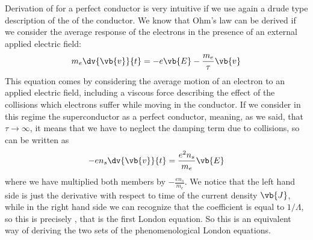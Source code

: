 Derivation of  for a perfect conductor is very intuitive if we use again a drude type description of the of the conductor. We know that Ohm's law can be derived if we consider the average response of the electrons in the presence of an external applied electric field:
\begin{equation}
   m_e \dv{\vb{v}}{t}
   =-e \vb{E} - \frac{m_e}{\tau} \vb{v}
   \label{eq:modello_di_Drude}
\end{equation}
This equation comes by considering the average motion of an electron to an applied electric field, including a viscous force describing the effect of the collisions which electrons suffer while moving in the conductor. If we consider in this regime the superconductor as a perfect conductor, meaning, as we said, that $\tau \to \infty$, it means that we have to neglect the damping term due to collisions, so  can be written as
\begin{equation*}
   -e n_s \dv{\vb{v}}{t}
   =\frac{e^2 n_s}{m_e} \vb{E}
\end{equation*}
where we have multiplied both members by $-\frac{e n_s}{m_e}$. We notice that the left hand side is just the derivative with respect to time of the current density $\vb{J}$, while in the right hand side we can recognize that the coefficient is equal to $1/\Lambda$, so this is precisely , that is the first London equation. So this is an equivalent way of deriving the two sets of the phenomenological London equations.\\
